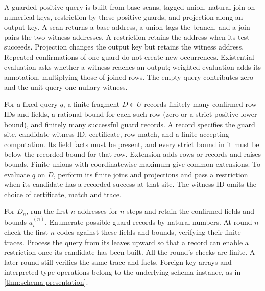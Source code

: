 \documentclass[11pt,a4paper]{article}
\theoremstyle{definition}
\theoremstyle{remark}\newaliascnt{remark}{theorem}
\numberwithin{equation}{section}
\begin{document}
A guarded positive query is built from base scans, tagged union, natural join on numerical keys, restriction by these positive guards, and projection along an output key. A scan returns a base address, a union tags the branch, and a join pairs the two witness addresses. A restriction retains the address when its test succeeds. Projection changes the output key but retains the witness address. Repeated confirmations of one guard do not create new occurrences. Existential evaluation asks whether a witness reaches an output; weighted evaluation adds its annotation, multiplying those of joined rows. The empty query contributes zero and the unit query one nullary witness.

For a fixed query $q$, a finite fragment $D\Subset U$ records finitely many confirmed row IDs and fields, a rational bound for each such row (zero or a strict positive lower bound), and finitely many successful guard records. A record specifies the guard site, candidate witness ID, certificate, row match, and a finite accepting computation. Its field facts must be present, and every strict bound in it must be below the recorded bound for that row. Extension adds rows or records and raises bounds. Finite unions with coordinatewise maximum give common extensions. To evaluate $q$ on $D$, perform its finite joins and projections and pass a restriction when its candidate has a recorded success at that site. The witness ID omits the choice of certificate, match and trace.

For $D_n$, run the first $n$ addresses for $n$ steps and retain the confirmed fields and bounds $a_i^{(n)}$. Enumerate possible guard records by natural numbers. At round $n$ check the first $n$ codes against these fields and bounds, verifying their finite traces. Process the query from its leaves upward so that a record can enable a restriction once its candidate has been built. All the round's checks are finite. A later round still verifies the same trace and facts. Foreign-key arrays and interpreted type operations belong to the underlying schema instance, as in \cref{thm:schema-presentation}.
\end{document}
